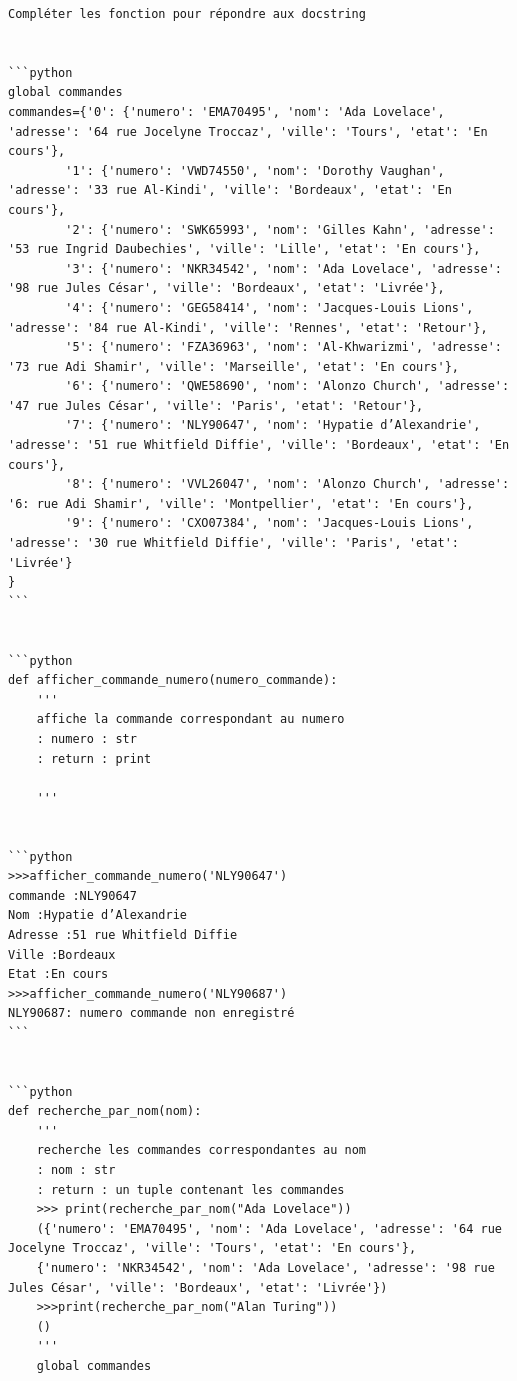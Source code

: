 \documentclass[
]{article}
\begin{document}
\begin{verbatim}
Compléter les fonction pour répondre aux docstring


```python
global commandes
commandes={'0': {'numero': 'EMA70495', 'nom': 'Ada Lovelace', 'adresse': '64 rue Jocelyne Troccaz', 'ville': 'Tours', 'etat': 'En cours'},
        '1': {'numero': 'VWD74550', 'nom': 'Dorothy Vaughan', 'adresse': '33 rue Al-Kindi', 'ville': 'Bordeaux', 'etat': 'En cours'},
        '2': {'numero': 'SWK65993', 'nom': 'Gilles Kahn', 'adresse': '53 rue Ingrid Daubechies', 'ville': 'Lille', 'etat': 'En cours'},
        '3': {'numero': 'NKR34542', 'nom': 'Ada Lovelace', 'adresse': '98 rue Jules César', 'ville': 'Bordeaux', 'etat': 'Livrée'},
        '4': {'numero': 'GEG58414', 'nom': 'Jacques-Louis Lions', 'adresse': '84 rue Al-Kindi', 'ville': 'Rennes', 'etat': 'Retour'},
        '5': {'numero': 'FZA36963', 'nom': 'Al-Khwarizmi', 'adresse': '73 rue Adi Shamir', 'ville': 'Marseille', 'etat': 'En cours'},
        '6': {'numero': 'QWE58690', 'nom': 'Alonzo Church', 'adresse': '47 rue Jules César', 'ville': 'Paris', 'etat': 'Retour'},
        '7': {'numero': 'NLY90647', 'nom': 'Hypatie d’Alexandrie', 'adresse': '51 rue Whitfield Diffie', 'ville': 'Bordeaux', 'etat': 'En cours'},
        '8': {'numero': 'VVL26047', 'nom': 'Alonzo Church', 'adresse': '6: rue Adi Shamir', 'ville': 'Montpellier', 'etat': 'En cours'},
        '9': {'numero': 'CXO07384', 'nom': 'Jacques-Louis Lions', 'adresse': '30 rue Whitfield Diffie', 'ville': 'Paris', 'etat': 'Livrée'}
}
```


```python
def afficher_commande_numero(numero_commande):
    '''
    affiche la commande correspondant au numero
    : numero : str
    : return : print

    '''
    

```python
>>>afficher_commande_numero('NLY90647')
commande :NLY90647
Nom :Hypatie d’Alexandrie
Adresse :51 rue Whitfield Diffie
Ville :Bordeaux
Etat :En cours
>>>afficher_commande_numero('NLY90687')
NLY90687: numero commande non enregistré
```


```python
def recherche_par_nom(nom):
    '''
    recherche les commandes correspondantes au nom
    : nom : str
    : return : un tuple contenant les commandes
    >>> print(recherche_par_nom("Ada Lovelace"))
    ({'numero': 'EMA70495', 'nom': 'Ada Lovelace', 'adresse': '64 rue Jocelyne Troccaz', 'ville': 'Tours', 'etat': 'En cours'},
    {'numero': 'NKR34542', 'nom': 'Ada Lovelace', 'adresse': '98 rue Jules César', 'ville': 'Bordeaux', 'etat': 'Livrée'})
    >>>print(recherche_par_nom("Alan Turing"))
    ()
    '''
    global commandes
    


\end{verbatim}
\end{document}
